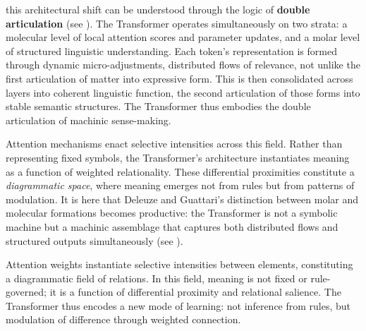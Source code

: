 this architectural shift can be understood through the logic of \textbf{double articulation} (see \cite{ai-inquiry2025a}). The Transformer operates simultaneously on two strata: a molecular level of local attention scores and parameter updates, and a molar level of structured linguistic understanding. Each \gls{token}’s representation is formed through dynamic micro-adjustments, distributed flows of relevance, not unlike the first articulation of matter into expressive form. This is then consolidated across layers into coherent linguistic function, the second articulation of those forms into stable semantic structures. The Transformer thus embodies the double articulation of machinic sense-making.

Attention mechanisms enact selective intensities across this field. Rather than representing fixed symbols, the Transformer’s architecture instantiates meaning as a function of weighted relationality. These differential proximities constitute a \emph{diagrammatic space}, where meaning emerges not from rules but from patterns of modulation. It is here that Deleuze and Guattari’s distinction between molar and molecular formations becomes productive: the Transformer is not a symbolic machine but a machinic assemblage that captures both distributed flows and structured outputs simultaneously (see \cite{ai-inquiry2025a}).




Attention weights instantiate selective intensities between elements, constituting a diagrammatic field of relations. In this field, meaning is not fixed or rule-governed; it is a function of differential proximity and relational salience. The Transformer thus encodes a new mode of learning: not inference from rules, but modulation of difference through weighted connection.




